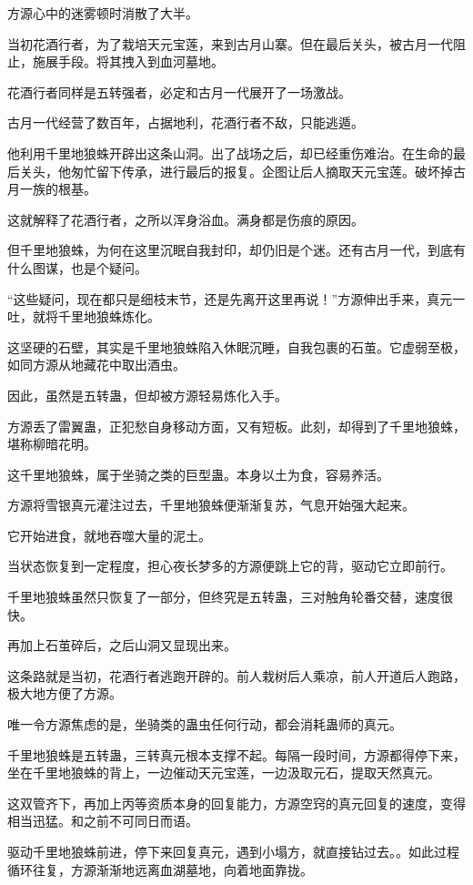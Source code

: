 \begin{this_body}
方源心中的迷雾顿时消散了大半。

当初花酒行者，为了栽培天元宝莲，来到古月山寨。但在最后关头，被古月一代阻止，施展手段。将其拽入到血河墓地。

花酒行者同样是五转强者，必定和古月一代展开了一场激战。

古月一代经营了数百年，占据地利，花酒行者不敌，只能逃遁。

他利用千里地狼蛛开辟出这条山洞。出了战场之后，却已经重伤难治。在生命的最后关头，他匆忙留下传承，进行最后的报复。企图让后人摘取天元宝莲。破坏掉古月一族的根基。

这就解释了花酒行者，之所以浑身浴血。满身都是伤痕的原因。

但千里地狼蛛，为何在这里沉眠自我封印，却仍旧是个迷。还有古月一代，到底有什么图谋，也是个疑问。

“这些疑问，现在都只是细枝末节，还是先离开这里再说！”方源伸出手来，真元一吐，就将千里地狼蛛炼化。

这坚硬的石壁，其实是千里地狼蛛陷入休眠沉睡，自我包裹的石茧。它虚弱至极，如同方源从地藏花中取出酒虫。

因此，虽然是五转蛊，但却被方源轻易炼化入手。

方源丢了雷翼蛊，正犯愁自身移动方面，又有短板。此刻，却得到了千里地狼蛛，堪称柳暗花明。

这千里地狼蛛，属于坐骑之类的巨型蛊。本身以土为食，容易养活。

方源将雪银真元灌注过去，千里地狼蛛便渐渐复苏，气息开始强大起来。

它开始进食，就地吞噬大量的泥土。

当状态恢复到一定程度，担心夜长梦多的方源便跳上它的背，驱动它立即前行。

千里地狼蛛虽然只恢复了一部分，但终究是五转蛊，三对触角轮番交替，速度很快。

再加上石茧碎后，之后山洞又显现出来。

这条路就是当初，花酒行者逃跑开辟的。前人栽树后人乘凉，前人开道后人跑路，极大地方便了方源。

唯一令方源焦虑的是，坐骑类的蛊虫任何行动，都会消耗蛊师的真元。

千里地狼蛛是五转蛊，三转真元根本支撑不起。每隔一段时间，方源都得停下来，坐在千里地狼蛛的背上，一边催动天元宝莲，一边汲取元石，提取天然真元。

这双管齐下，再加上丙等资质本身的回复能力，方源空窍的真元回复的速度，变得相当迅猛。和之前不可同日而语。

驱动千里地狼蛛前进，停下来回复真元，遇到小塌方，就直接钻过去。。如此过程循环往复，方源渐渐地远离血湖墓地，向着地面靠拢。

\end{this_body}

